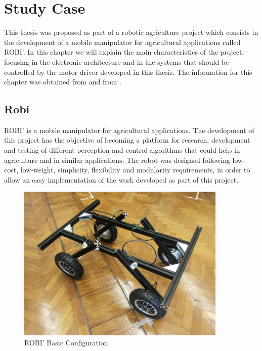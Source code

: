 \chapter{Study Case} \label{chap:robi}

This thesis was proposed as part of a robotic agriculture project which consists in the development of a mobile manipulator for agricultural applications called ROBI'. In this chapter we will explain the main characteristics of the project, focusing in the electronic architecture and in the systems that should be controlled by the motor driver developed in this thesis. The information for this chapter was obtained from \citeauthor{robi:2017}  \citeyear{robi:2017} and from \citeauthor{robi2:2017}  \citeyear{robi2:2017}.

\section{Robi}

ROBI' is a mobile manipulator for agricultural applications. The development of this project has the objective of becoming a platform for research, development and testing of different perception and control algorithms that could help in agriculture and in similar applications. The robot was designed following low-cost, low-weight, simplicity, flexibility and modularity requirements, in order to allow an easy implementation of the work developed as part of this project.

\begin{figure}[htbp]
\centering
\includegraphics[width=10cm]{Images/robi.png} 
\caption[ROBI' Basic Configuration]{ROBI' Basic Configuration}
\label{fig:robi_picture}
\end{figure}

